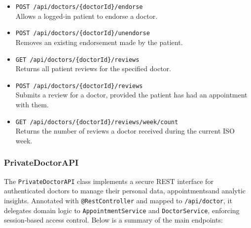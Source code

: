\begin{itemize}
	\item \texttt{POST /api/doctors/\{doctorId\}/endorse} \\
	Allows a logged-in patient to endorse a doctor.
	
	\item \texttt{POST /api/doctors/\{doctorId\}/unendorse} \\
	Removes an existing endorsement made by the patient.
	
	\item \texttt{GET /api/doctors/\{doctorId\}/reviews} \\
	Returns all patient reviews for the specified doctor.
	
	\item \texttt{POST /api/doctors/\{doctorId\}/reviews} \\
	Submits a review for a doctor, provided the patient has had an appointment with them.
	
	\item \texttt{GET /api/doctors/\{doctorId\}/reviews/week/count} \\
	Returns the number of reviews a doctor received during the current ISO week.
\end{itemize}

\subsubsection{PrivateDoctorAPI}
The \texttt{PrivateDoctorAPI} class implements a secure REST interface for authenticated doctors to manage their personal data, appointmentsand analytic insights. Annotated with \texttt{@RestController} and mapped to \texttt{/api/doctor}, it delegates domain logic to \texttt{AppointmentService} and \texttt{DoctorService}, enforcing session‐based access control. Below is a summary of the main endpoints:

